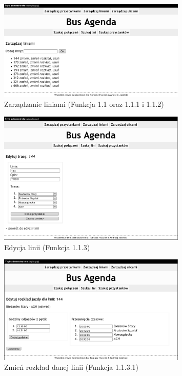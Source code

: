\begin{figure}[!htp]
    \centering
    \includegraphics[width=0.8\textwidth]{./img/screens/manageLines_main.eps}
    \caption{Zarządzanie liniami (Funkcja 1.1 oraz 1.1.1 i 1.1.2)}
    \label{fig:adminMain}
\end{figure}
\begin{figure}[!htp]
    \centering
    \includegraphics[width=0.8\textwidth]{./img/screens/manageLine.eps}
    \caption{Edycja linii (Funkcja 1.1.3)}
    \label{fig:adminMain}
\end{figure}
\begin{figure}[!htp]
    \centering
    \includegraphics[width=0.8\textwidth]{./img/screens/manageLine_tt.eps}
    \caption{Zmień rozkład danej linii (Funkcja 1.1.3.1)}
    \label{fig:adminMain}
\end{figure}
